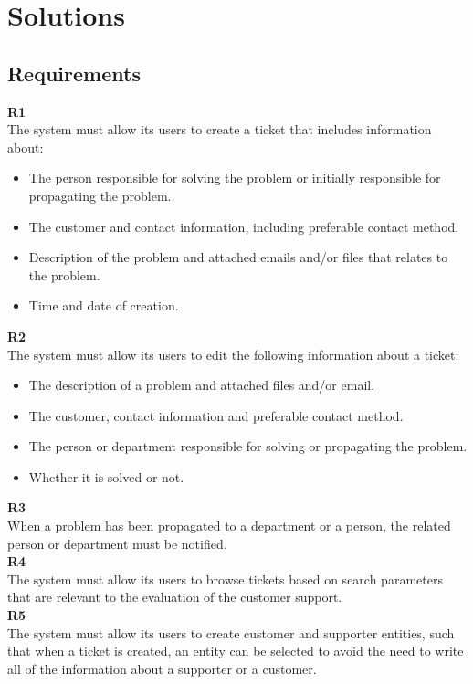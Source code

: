 \chapter{Solutions}
\label{chap:solutions}
\section{Requirements}
\label{sec:requirements}
\textbf{R1} \\
The system must allow its users to create a ticket that includes information about:
\begin{itemize}
\item The person responsible for solving the problem or initially responsible for propagating the problem.
\item The customer and contact information, including preferable contact method.
\item Description of the problem and attached emails and/or files that relates to the problem.
\item Time and date of creation.
\end{itemize}

\textbf{R2} \\
The system must allow its users to edit the following information about a ticket:
\begin{itemize}
\item The description of a problem and attached files and/or email.
\item The customer, contact information and preferable contact method.
\item The person or department responsible for solving or propagating the problem.
\item Whether it is solved or not.
\end{itemize}

\textbf{R3} \\
When a problem has been propagated to a department or a person, the related person or department must be notified. \\

\textbf{R4} \\
The system must allow its users to browse tickets based on search parameters that are relevant to the evaluation of the customer support. \\

\textbf{R5} \\
The system must allow its users to create customer and supporter entities, such that when a ticket is created, an entity can be selected to avoid the need to write all of the information about a supporter or a customer. \\


